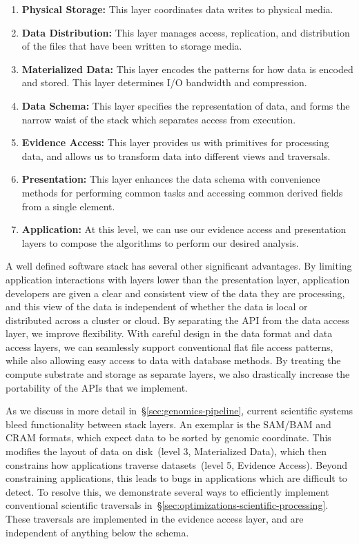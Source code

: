 \documentclass{acm_proc_article-sp}
\begin{document}
\begin{enumerate}
\item {\bf Physical Storage:} This layer coordinates data writes to physical media.
\item {\bf Data Distribution:} This layer manages access, replication, and distribution of the files that have
been written to storage media.
\item {\bf Materialized Data:} This layer encodes the patterns for how data is encoded and stored. This
layer determines I/O bandwidth and compression.
\item {\bf Data Schema:} This layer specifies the representation of data, and forms the narrow waist of the
stack which separates access from execution.
\item {\bf Evidence Access:} This layer provides us with primitives for processing data, and allows us to
transform data into different views and traversals.
\item {\bf Presentation:} This layer enhances the data schema with convenience methods for performing
common tasks and accessing common derived fields from a single element.
\item {\bf Application:} At this level, we can use our evidence access and presentation layers to compose
the algorithms to perform our desired analysis.
\end{enumerate}

A well defined software stack has several other significant advantages. By limiting application
interactions with layers lower than the presentation layer, application developers are given a clear and
consistent view of the data they are processing, and this view of the data is independent of whether the
data is local or distributed across a cluster or cloud. By separating the API from the data access layer,
we improve flexibility. With careful design in the data format and data access layers, we can seamlessly
support conventional flat file access patterns, while also allowing easy access to data with database
methods. By treating the compute substrate and storage as separate layers, we also drastically increase
the portability of the APIs that we implement.

As we discuss in more detail in~\S\ref{sec:genomics-pipeline}, current scientific systems bleed functionality
between stack layers. An exemplar is the SAM/BAM and CRAM formats, which expect data to be sorted by
genomic coordinate. This modifies the layout of data on disk~(level 3, Materialized Data), which then
constrains how applications traverse datasets~(level 5, Evidence Access). Beyond constraining
applications, this leads to bugs in applications which are difficult to detect. To resolve this, we demonstrate
several ways to efficiently implement conventional scientific traversals
in~\S\ref{sec:optimizations-scientific-processing}. These traversals are implemented in the evidence access
layer, and are independent of anything below the schema.
\end{document}
